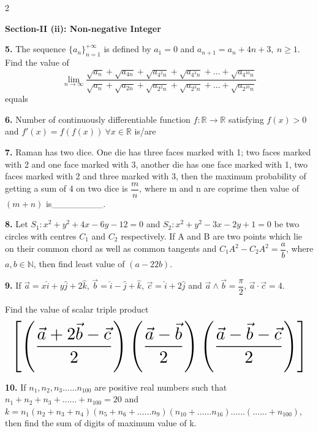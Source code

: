 \documentclass[10pt]{extarticle}
\newcommand{\subsectionhdr}[1]{\par\vspace{3pt}\noindent\textbf{#1}\par\vspace{2pt}}
\begin{document}
\begin{multicols}{2}
\subsectionhdr{Section-II (ii): Non-negative Integer}

\textbf{5.} The sequence $\{a_n\}_{n=1}^{+\infty}$ is defined by $a_1=0$ and $a_{n+1}=a_n+4n+3,\ n\geq1$. Find the value of
$$\lim_{n\to\infty}\dfrac{\sqrt{a_n}+\sqrt{a_{4n}}+\sqrt{a_{4^2n}}+\sqrt{a_{4^3n}}+\ldots+\sqrt{a_{4^{10}n}}}{\sqrt{a_n}+\sqrt{a_{2n}}+\sqrt{a_{2^2n}}+\sqrt{a_{2^3n}}+\ldots+\sqrt{a_{2^{10}n}}}$$
equals

\textbf{6.} Number of continuously differentiable function $f:\mathbb R\to\mathbb R$ satisfying $f(x)>0$ and $f'(x)=f(f(x))\ \forall x\in\mathbb R$ is/are

\textbf{7.} Raman has two dice. One die has three faces marked with 1; two faces marked with 2 and one face marked with 3, another die has one face marked with 1, two faces marked with 2 and three marked with 3, then the maximum probability of getting a sum of 4 on two dice is $\dfrac mn$, where m and n are coprime then value of $(m+n)$ is\_\_\_\_\_\_\_\_.

\textbf{8.} Let $S_1:x^2+y^2+4x-6y-12=0$ and $S_2:x^2+y^2-3x-2y+1=0$ be two circles with centres $C_1$ and $C_2$ respectively. If A and B are two points which lie on their common chord as well as common tangents and $C_1A^2-C_2A^2=\dfrac ab$, where $a,b\in\mathbb N$, then find least value of $(a-22b)$.

\textbf{9.} If $\vec a=x\hat i+y\hat j+2\hat k$, $\vec b=\hat i-\hat j+\hat k$, $\vec c=\hat i+2\hat j$ and $\vec a\wedge\vec b=\dfrac\pi2$, $\vec a\cdot\vec c=4$.

Find the value of scalar triple product
$$\resizebox{\linewidth}{!}{$\left[\left(\dfrac{\vec a+2\vec b-\vec c}2\right)\left(\dfrac{\vec a-\vec b}2\right)\left(\dfrac{\vec a-\vec b-\vec c}2\right)\right]$}$$

\textbf{10.} If $n_1,n_2,n_3\ldots\ldots n_{100}$ are positive real numbers such that $n_1+n_2+n_3+\ldots\ldots+n_{100}=20$ and $k=n_1(n_2+n_3+n_4)(n_5+n_6+\ldots\ldots n_9)(n_{10}+\ldots\ldots n_{16})\ldots\ldots(\ldots\ldots+n_{100})$, then find the sum of digits of maximum value of k.

\end{multicols}
\end{document}
